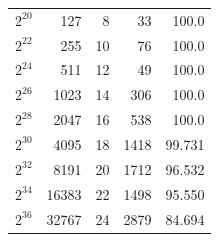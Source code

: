 \documentclass[conference,compsoc]{IEEEtran}
\begin{document}
\begin{table}[!t]
\begin{tabular}{rrrrr}
		\rowcolor[HTML]{FFFFFF} 
		$2^{20}$                                                             & 127                                                                              & 8                            & 33                        & 100.0                          \\
		\rowcolor[HTML]{FFFFFF} 
		$2^{22}$                                                              & 255                                                                              & 10                           & 76                        & 100.0                          \\
		\rowcolor[HTML]{FFFFFF} 
		$2^{24}$                                                              & 511                                                                              & 12                           & 49                        & 100.0                          \\
		\rowcolor[HTML]{FFFFFF} 
		$2^{26}$                                                             & 1023                                                                             & 14                           & 306                       & 100.0                          \\
		\rowcolor[HTML]{FFFFFF} 
		$2^{28}$                                                              & 2047                                                                             & 16                           & 538                       & 100.0                          \\
		\rowcolor[HTML]{FFFFFF} 
		$2^{30}$                                                              & 4095                                                                             & 18                           & 1418                      & 99.731                       \\
		\rowcolor[HTML]{FFFFFF} 
		$2^{32}$                                                              & 8191                                                                             & 20                           & 1712                      & 96.532                       \\
		\rowcolor[HTML]{FFFFFF} 
		$2^{34}$                                                              & 16383                                                                            & 22                           & 1498                      & 95.550                       \\
		\rowcolor[HTML]{FFFFFF} 
		$2^{36}$                                                              & 32767                                                                            & 24                           & 2879                      & 84.694                       \\

\end{tabular}
\end{table}
\end{document}
